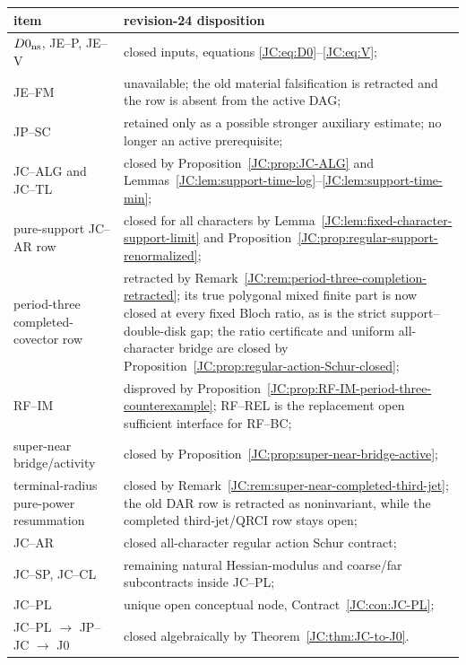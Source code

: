 \begin{center}
\begin{longtable}{>{\raggedright\arraybackslash}p{.34\linewidth}
                  >{\raggedright\arraybackslash}p{.54\linewidth}}
\toprule
item & revision-24 disposition\\
\midrule
$D0_{\rm ns}$, JE--P, JE--V & closed inputs, equations
\eqref{JC:eq:D0}--\eqref{JC:eq:V};\\
JE--FM & unavailable; the old material falsification is retracted and the
row is absent from the active DAG;\\
JP--SC & retained only as a possible stronger auxiliary estimate; no
longer an active prerequisite;\\
JC--ALG and JC--TL & closed by Proposition~\ref{JC:prop:JC-ALG} and
Lemmas~\ref{JC:lem:support-time-log}--\ref{JC:lem:support-time-min};\\
pure-support JC--AR row & closed for all characters by
Lemma~\ref{JC:lem:fixed-character-support-limit} and
Proposition~\ref{JC:prop:regular-support-renormalized};\\
period-three completed-covector row & retracted by
Remark~\ref{JC:rem:period-three-completion-retracted}; its true polygonal
mixed finite part is now closed at every fixed Bloch ratio, as is the
strict support--double-disk gap; the ratio certificate and uniform
all-character bridge are closed by
Proposition~\ref{JC:prop:regular-action-Schur-closed};\\
RF--IM & disproved by
Proposition~\ref{JC:prop:RF-IM-period-three-counterexample}; RF--REL is the
replacement open sufficient interface for RF--BC;\\
super-near bridge/activity & closed by
Proposition~\ref{JC:prop:super-near-bridge-active};\\
terminal-radius pure-power resummation & closed by
Remark~\ref{JC:rem:super-near-completed-third-jet}; the old DAR row is
retracted as noninvariant, while the completed third-jet/QRCI row stays open;\\
JC--AR & closed all-character regular action Schur contract;\\
JC--SP, JC--CL & remaining natural Hessian-modulus and coarse/far
subcontracts inside JC--PL;\\
JC--PL & unique open conceptual node, Contract~\ref{JC:con:JC-PL};\\
JC--PL $\to$ JP--JC $\to$ J0 & closed algebraically by
Theorem~\ref{JC:thm:JC-to-J0}.\\
\bottomrule
\end{longtable}
\end{center}
\endgroup
